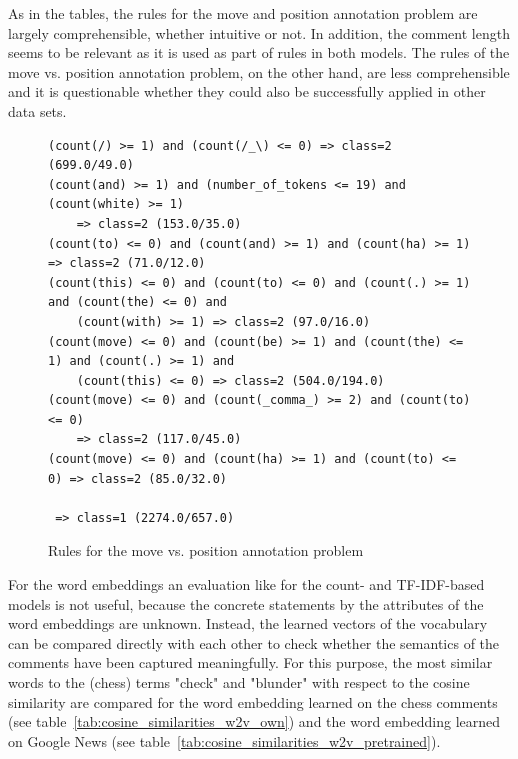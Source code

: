 \documentclass[article,type=msc,colorback,accentcolor=tud7b]{tudthesis}
\begin{document}
    As in the tables, the rules for the move and position annotation problem are largely comprehensible, whether intuitive or not. In addition, the comment length seems to be relevant as it is used as part of rules in both models. The rules of the move vs. position annotation problem, on the other hand, are less comprehensible and it is questionable whether they could also be successfully applied in other data sets.
    	
	\begin{figure}[H]
	  \centering
	  \begin{lstlisting}	  
(count(/) >= 1) and (count(/_\) <= 0) => class=2 (699.0/49.0)
(count(and) >= 1) and (number_of_tokens <= 19) and (count(white) >= 1) 
	=> class=2 (153.0/35.0)
(count(to) <= 0) and (count(and) >= 1) and (count(ha) >= 1) => class=2 (71.0/12.0)
(count(this) <= 0) and (count(to) <= 0) and (count(.) >= 1) and (count(the) <= 0) and 
	(count(with) >= 1) => class=2 (97.0/16.0)
(count(move) <= 0) and (count(be) >= 1) and (count(the) <= 1) and (count(.) >= 1) and 
	(count(this) <= 0) => class=2 (504.0/194.0)
(count(move) <= 0) and (count(_comma_) >= 2) and (count(to) <= 0) 
	=> class=2 (117.0/45.0)
(count(move) <= 0) and (count(ha) >= 1) and (count(to) <= 0) => class=2 (85.0/32.0)

 => class=1 (2274.0/657.0)
	  \end{lstlisting}
      \caption{Rules for the move vs. position annotation problem}
      \label{fig:move_vs_position_rules}
	\end{figure}
	
    For the word embeddings an evaluation like for the count- and TF-IDF-based models is not useful, because the concrete statements by the attributes of the word embeddings are unknown. Instead, the learned vectors of the vocabulary can be compared directly with each other to check whether the semantics of the comments have been captured meaningfully. For this purpose, the most similar words to the (chess) terms "check" and "blunder" with respect to the cosine similarity are compared for the word embedding learned on the chess comments (see table~\ref{tab:cosine_similarities_w2v_own}) and the word embedding learned on Google News (see table~\ref{tab:cosine_similarities_w2v_pretrained}).
\end{document}
